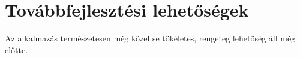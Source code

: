 \chapter{Továbbfejlesztési lehetőségek}
\label{appx:further_development}

Az alkalmazás természetesen még közel se tökéletes, rengeteg lehetőség áll még előtte.
